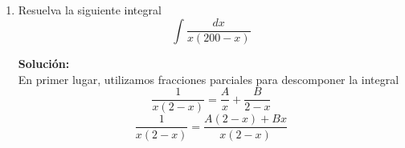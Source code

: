 \documentclass[12pt]{article}
\newenvironment{solucion}
{\begin{mdframed}[backgroundcolor=black!10]
		{\bf Solución:}\\
	}
	{
	\end{mdframed}
}
\newenvironment{preguntas}
{\begin{enumerate}\itemsep12pt
	}
	{
	\end{enumerate}
}
\newcommand{\ra}{\rightarrow}
\begin{document}
\begin{preguntas}
\begin{solucion}
\begin{enumerate}[a)]
\begin{center}
\begin{tikzpicture}[scale=1.25]
				\end{tikzpicture}
			\end{center}
			Finalmente, 
			$$\displaystyle\int \dfrac{xdx}{\sqrt[]{1+x^2}} = \sqrt[]{1+x^2} + c$$
\item $\displaystyle\int \dfrac{dx}{x\ \sqrt[]{x^2-1}}$\\\\
			Al identificar la expresión de la forma $x^2-a^2$, sabemos que debemos ocupar
			$$x = sec(\theta) \ra dx = sec(\theta)tan(\theta)$$
			Luego obtenemos
			$$\displaystyle\int \dfrac{sec(\theta)tan(\theta)d\theta}{sec(\theta)\ \sqrt[]{sec^2(\theta)-1}}
			= \displaystyle\int \dfrac{tan(\theta)d\theta}{\sqrt[]{tan^2(\theta)}}
			= \displaystyle\int d\theta = \theta + c$$
			Como $x = sec(\theta) \ra \theta = arcsec(x)$
			Finalmente,
			$$\displaystyle\int \dfrac{dx}{x\ \sqrt[]{x^2-1}} = arcsec(x) + c$$
\item $\displaystyle\int \dfrac{dx}{\sqrt[]{16+6x-x^2}}$\\\\
			Como no podemos ver ninguna expresión como las mencionadas anteriormente, vamos a hacer completación de cuadrados
			$$16+6x-x^2 = 25 - 9 + 6x - x^2 = 25 - (x^2-6x+9) = 25 - (x-3)^2$$
			Luego, la integral es
			$$\displaystyle\int \dfrac{dx}{\sqrt[]{25 - (x-3)^2}}$$
			Aqui si podemos identificar una expresión del tipo $a^2-x^2$, por lo que el cambio que corresponde hacer es
			$$x-3 = 5sen(\theta) \ra dx = 5cos(\theta)d\theta$$
			Entonces obtenemos la integral
			$$\displaystyle\int \dfrac{5cos(\theta)d\theta}{\sqrt[]{25 - 25sen^2(\theta)}}
			=\displaystyle\int \dfrac{5cos(\theta)d\theta}{\sqrt[]{25(1 - sen^2(\theta))}}
			=\displaystyle\int \dfrac{5cos(\theta)d\theta}{\sqrt[]{25cos^2(\theta)}}$$
			$$=\displaystyle\int \dfrac{5cos(\theta)d\theta}{5cos(\theta)} 
			= \displaystyle\int d\theta = \theta + c$$
			Como $x-3 = 5sen(\theta) \ra \theta = arcsen\left(\dfrac{x-3}{5}\right)$\\
			Finalmente,
			$$\displaystyle\int \dfrac{dx}{\sqrt[]{16+6x-x^2}} = arcsen\left(\dfrac{x-3}{5}\right) + c$$
\end{enumerate}
\end{solucion}
\item Resuelva la siguiente integral
	$$\displaystyle\int \dfrac{dx}{x(200-x)}$$
\begin{solucion}
En primer lugar, utilizamos fracciones parciales para descomponer la integral
		$$\dfrac{1}{x(2-x)} = \dfrac{A}{x} + \dfrac{B}{2-x}$$
		$$\dfrac{1}{x(2-x)} = \dfrac{A(2-x) + Bx}{x(2-x)}$$

\end{solucion}
\end{preguntas}
\end{document}

